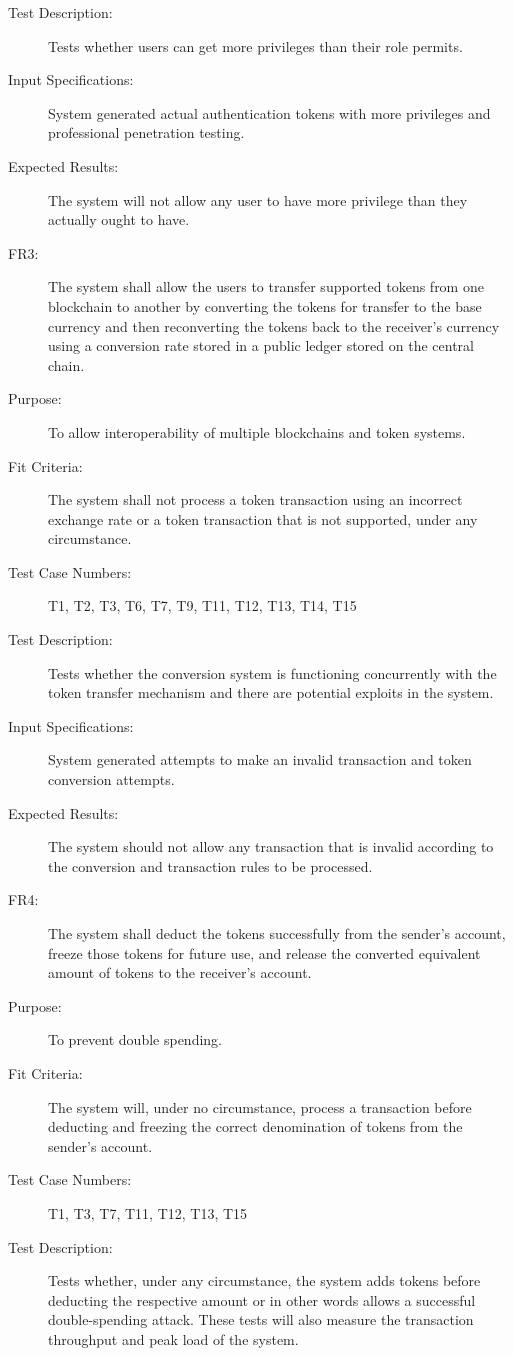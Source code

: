 \documentclass[a4paper,twoside,phd]{BYUPhys}
\begin{document}
\begin{description}
\item[Test Description:] Tests whether users can get more privileges than their role permits.
\item[Input Specifications:] System generated actual authentication tokens with more privileges and professional penetration testing.
\item[Expected Results:] The system will not allow any user to have more privilege than they actually ought to have.
\\
\item[FR3:] The system shall allow the users to transfer supported tokens from one blockchain to another by converting the tokens for transfer to the base currency and then reconverting the tokens back to the receiver’s currency using a conversion rate stored in a public ledger stored on the central chain.
\item[Purpose:] To allow interoperability of multiple blockchains and token systems.
\item[Fit Criteria:] The system shall not process a token transaction using an incorrect exchange rate or a token transaction that is not supported, under any circumstance.
\item[Test Case Numbers:] T1, T2, T3, T6, T7, T9, T11, T12, T13, T14, T15
\item[Test Description:] Tests whether the conversion system is functioning concurrently with the token transfer mechanism and there are potential exploits in the system.
\item[Input Specifications:] System generated attempts to make an invalid transaction and token conversion attempts.
\item[Expected Results:] The system should not allow any transaction that is invalid according to the conversion and transaction rules to be processed.
\\
\item[FR4:] The system shall deduct the tokens successfully from the sender’s account, freeze those tokens for future use, and release the converted equivalent amount of tokens to the receiver’s account.
\item[Purpose:] To prevent double spending.
\item[Fit Criteria:] The system will, under no circumstance, process a transaction before deducting and freezing the correct denomination of tokens from the sender's account.
\item[Test Case Numbers:] T1, T3, T7, T11, T12, T13, T15
\item[Test Description:] Tests whether, under any circumstance, the system adds tokens before deducting the respective amount or in other words allows a successful double-spending attack. These tests will also measure the transaction throughput and peak load of the system.

\end{description}
\end{document}
